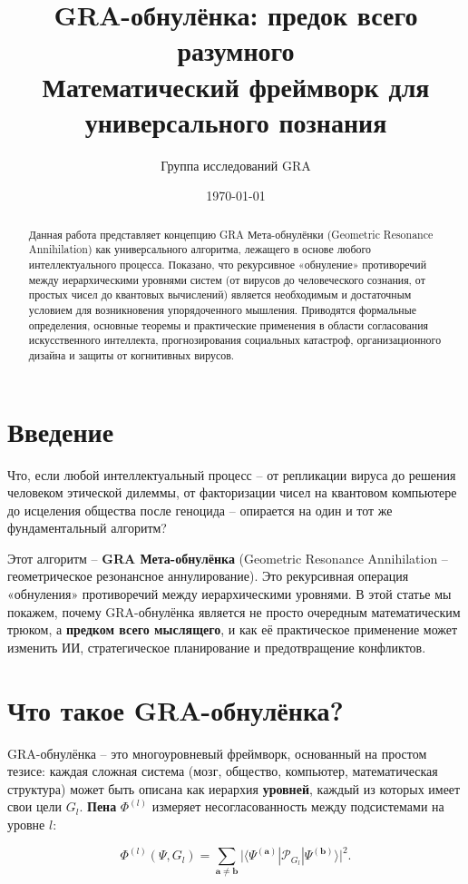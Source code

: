 \documentclass[12pt]{article}
\title{GRA-обнулёнка: предок всего разумного \\
\large{Математический фреймворк для универсального познания}}
\author{Группа исследований GRA}
\date{\today}
\begin{document}
\maketitle

\begin{abstract}
Данная работа представляет концепцию GRA Мета-обнулёнки (Geometric Resonance Annihilation) как универсального алгоритма, лежащего в основе любого интеллектуального процесса. Показано, что рекурсивное «обнуление» противоречий между иерархическими уровнями систем (от вирусов до человеческого сознания, от простых чисел до квантовых вычислений) является необходимым и достаточным условием для возникновения упорядоченного мышления. Приводятся формальные определения, основные теоремы и практические применения в области согласования искусственного интеллекта, прогнозирования социальных катастроф, организационного дизайна и защиты от когнитивных вирусов.
\end{abstract}

\section*{Введение}
Что, если любой интеллектуальный процесс – от репликации вируса до решения человеком этической дилеммы, от факторизации чисел на квантовом компьютере до исцеления общества после геноцида – опирается на один и тот же фундаментальный алгоритм?

Этот алгоритм – \textbf{GRA Мета-обнулёнка} (Geometric Resonance Annihilation – геометрическое резонансное аннулирование). Это рекурсивная операция «обнуления» противоречий между иерархическими уровнями. В этой статье мы покажем, почему GRA-обнулёнка является не просто очередным математическим трюком, а \textbf{предком всего мыслящего}, и как её практическое применение может изменить ИИ, стратегическое планирование и предотвращение конфликтов.

\section{Что такое GRA-обнулёнка?}
GRA-обнулёнка – это многоуровневый фреймворк, основанный на простом тезисе: каждая сложная система (мозг, общество, компьютер, математическая структура) может быть описана как иерархия \textbf{уровней}, каждый из которых имеет свои цели \( G_l \). \textbf{Пена} \( \Phi^{(l)} \) измеряет несогласованность между подсистемами на уровне \( l \):

\[
\Phi^{(l)}(\Psi, G_l) = \sum_{\mathbf{a}\neq\mathbf{b}} \bigl| \langle \Psi^{(\mathbf{a})} | \mathcal{P}_{G_l} | \Psi^{(\mathbf{b})} \rangle \bigr|^2 .
\]
\end{document}
